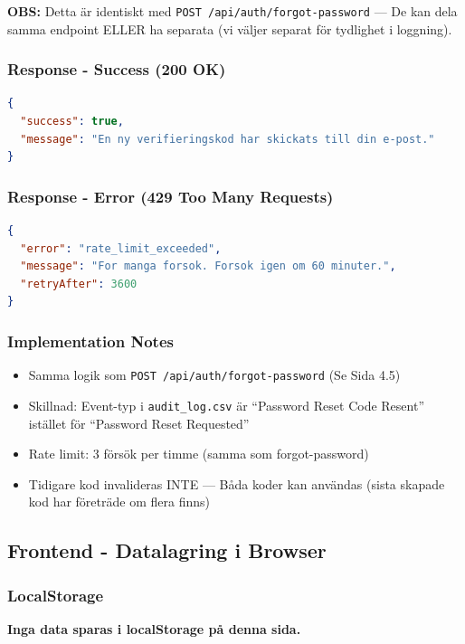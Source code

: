 \documentclass[12pt,a4paper]{article}
\begin{document}
\textbf{OBS:} Detta är identiskt med \texttt{POST /api/auth/forgot-password} — De kan dela samma endpoint ELLER ha separata (vi väljer separat för tydlighet i loggning).

\subsubsection{Response - Success (200 OK)}
\begin{lstlisting}[language=json]
{
  "success": true,
  "message": "En ny verifieringskod har skickats till din e-post."
}
\end{lstlisting}

\subsubsection{Response - Error (429 Too Many Requests)}
\begin{lstlisting}[language=json]
{
  "error": "rate_limit_exceeded",
  "message": "For manga forsok. Forsok igen om 60 minuter.",
  "retryAfter": 3600
}
\end{lstlisting}

\subsubsection{Implementation Notes}
\begin{itemize}[noitemsep]
  \item Samma logik som \texttt{POST /api/auth/forgot-password} (Se Sida 4.5)
  \item Skillnad: Event-typ i \texttt{audit\_log.csv} är ``Password Reset Code Resent'' istället för ``Password Reset Requested''
  \item Rate limit: 3 försök per timme (samma som forgot-password)
  \item Tidigare kod invalideras INTE — Båda koder kan användas (sista skapade kod har företräde om flera finns)
\end{itemize}

\subsection{Frontend - Datalagring i Browser}

\subsubsection{LocalStorage}
\textbf{Inga data sparas i localStorage på denna sida.}
\end{document}

